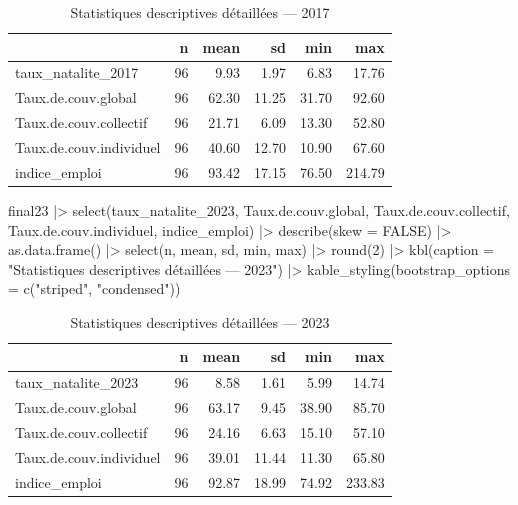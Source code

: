 \documentclass[
  letterpaper,
  DIV=11,
  numbers=noendperiod]{scrartcl}
\newenvironment{Shaded}{\begin{snugshade}}{\end{snugshade}}
\newcommand{\AttributeTok}[1]{\textcolor[rgb]{0.40,0.45,0.13}{#1}}
\newcommand{\ConstantTok}[1]{\textcolor[rgb]{0.56,0.35,0.01}{#1}}
\newcommand{\DecValTok}[1]{\textcolor[rgb]{0.68,0.00,0.00}{#1}}
\newcommand{\FunctionTok}[1]{\textcolor[rgb]{0.28,0.35,0.67}{#1}}
\newcommand{\NormalTok}[1]{\textcolor[rgb]{0.00,0.23,0.31}{#1}}
\newcommand{\SpecialCharTok}[1]{\textcolor[rgb]{0.37,0.37,0.37}{#1}}
\newcommand{\StringTok}[1]{\textcolor[rgb]{0.13,0.47,0.30}{#1}}
\begin{document}
\begin{table}
\centering
\caption{\label{tab:stats-psych}Statistiques descriptives détaillées — 2017}
\centering
\begin{tabular}[t]{l|r|r|r|r|r}
\hline
  & n & mean & sd & min & max\\
\hline
taux\_natalite\_2017 & 96 & 9.93 & 1.97 & 6.83 & 17.76\\
\hline
Taux.de.couv.global & 96 & 62.30 & 11.25 & 31.70 & 92.60\\
\hline
Taux.de.couv.collectif & 96 & 21.71 & 6.09 & 13.30 & 52.80\\
\hline
Taux.de.couv.individuel & 96 & 40.60 & 12.70 & 10.90 & 67.60\\
\hline
indice\_emploi & 96 & 93.42 & 17.15 & 76.50 & 214.79\\
\hline
\end{tabular}
\end{table}

\begin{Shaded}
\begin{Highlighting}[]
\NormalTok{final23 }\SpecialCharTok{|\textgreater{}}
  \FunctionTok{select}\NormalTok{(taux\_natalite\_2023, Taux.de.couv.global, Taux.de.couv.collectif,}
\NormalTok{         Taux.de.couv.individuel, indice\_emploi) }\SpecialCharTok{|\textgreater{}}
  \FunctionTok{describe}\NormalTok{(}\AttributeTok{skew =} \ConstantTok{FALSE}\NormalTok{) }\SpecialCharTok{|\textgreater{}}
  \FunctionTok{as.data.frame}\NormalTok{() }\SpecialCharTok{|\textgreater{}}
  \FunctionTok{select}\NormalTok{(n, mean, sd, min, max) }\SpecialCharTok{|\textgreater{}}
  \FunctionTok{round}\NormalTok{(}\DecValTok{2}\NormalTok{) }\SpecialCharTok{|\textgreater{}}
  \FunctionTok{kbl}\NormalTok{(}\AttributeTok{caption =} \StringTok{"Statistiques descriptives détaillées — 2023"}\NormalTok{) }\SpecialCharTok{|\textgreater{}}
  \FunctionTok{kable\_styling}\NormalTok{(}\AttributeTok{bootstrap\_options =} \FunctionTok{c}\NormalTok{(}\StringTok{"striped"}\NormalTok{, }\StringTok{"condensed"}\NormalTok{))}
\end{Highlighting}
\end{Shaded}

\begin{table}
\centering
\caption{\label{tab:stats-psych}Statistiques descriptives détaillées — 2023}
\centering
\begin{tabular}[t]{l|r|r|r|r|r}
\hline
  & n & mean & sd & min & max\\
\hline
taux\_natalite\_2023 & 96 & 8.58 & 1.61 & 5.99 & 14.74\\
\hline
Taux.de.couv.global & 96 & 63.17 & 9.45 & 38.90 & 85.70\\
\hline
Taux.de.couv.collectif & 96 & 24.16 & 6.63 & 15.10 & 57.10\\
\hline
Taux.de.couv.individuel & 96 & 39.01 & 11.44 & 11.30 & 65.80\\
\hline
indice\_emploi & 96 & 92.87 & 18.99 & 74.92 & 233.83\\
\hline
\end{tabular}
\end{table}
\end{document}
